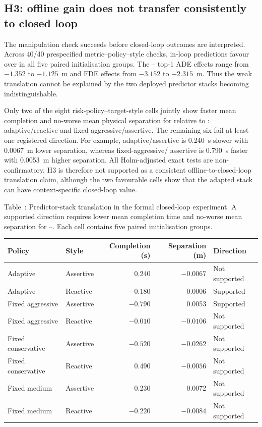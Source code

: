 \subsection{H3: offline gain does not transfer consistently to closed loop}

The manipulation check succeeds before closed-loop outcomes are interpreted.
Across 40/40 prespecified metric--policy--style checks, in-loop predictions
favour \Bone{} over \Bzero{} in all five paired initialisation groups. The
\Bone{}--\Bzero{} top-1 ADE effects range from $-1.352$ to $-1.125$~m and FDE
effects from $-3.152$ to $-2.315$~m. Thus the weak translation cannot be
explained by the two deployed predictor stacks becoming indistinguishable.

Only two of the eight risk-policy--target-style cells jointly show faster mean
completion and no-worse mean physical separation for \Bone{} relative to
\Bzero{}: adaptive/reactive and fixed-aggressive/assertive. The remaining six
fail at least one registered direction. For example, adaptive/assertive is
0.240~s slower with 0.0067~m lower separation, whereas fixed-aggressive/
assertive is 0.790~s faster with 0.0053~m higher separation. All Holm-adjusted
exact tests are non-confirmatory. H3 is therefore not supported as a consistent
offline-to-closed-loop translation claim, although the two favourable cells
show that the adapted stack can have context-specific closed-loop value.

\begin{center}
  \label{tab:h3-translation}
  \small
  Table~\thetable: Predictor-stack translation in the formal closed-loop experiment.
  A supported direction requires lower mean completion time and no-worse mean
  separation for \Bone{}--\Bzero{}. Each cell contains five paired
  initialisation groups.\par\smallskip
  \begin{tabular}{@{}llrrl@{}}
    \toprule
    Policy & Style & Completion (s) & Separation (m) & Direction \\
    \midrule
    Adaptive & Assertive &  0.240 & $-0.0067$ & Not supported \\
    Adaptive & Reactive & $-0.180$ &  0.0006 & Supported \\
    Fixed aggressive & Assertive & $-0.790$ &  0.0053 & Supported \\
    Fixed aggressive & Reactive & $-0.010$ & $-0.0106$ & Not supported \\
    Fixed conservative & Assertive & $-0.520$ & $-0.0262$ & Not supported \\
    Fixed conservative & Reactive &  0.490 & $-0.0056$ & Not supported \\
    Fixed medium & Assertive &  0.230 &  0.0072 & Not supported \\
    Fixed medium & Reactive & $-0.220$ & $-0.0084$ & Not supported \\
    \bottomrule
\end{tabular}
\end{center}

